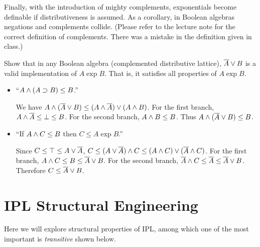 \documentclass[12pt]{article}
\newcommand{\cut}[1]{}
\newcommand{\showsol}[1]{\color{FireBrick}#1\normalcolor}%
\newcommand{\showsol}[1]{\cut{#1}}%
\newenvironment{sol}{\trivlist \item[\hskip \labelsep{\bf
Solution:}]}{\endtrivlist}
\begin{document}
Finally, with the introduction of mighty complements,
exponentials become definable if distributiveness is assumed.
As a corollary, in Boolean algebras negations and complements collide.
(Please refer to the lecture note for the correct definition of complements.
There was a mistake in the definition given in class.)
\begin{task}
  Show that in any Boolean algebra (complemented distributive lattice),
  $\overline{A} \vee B$ is a valid implementation of $A \exp B$.
  That is, it satisfies all properties of $A \exp B$.
\end{task}
\showsol{
\begin{sol}\mbox{}
  \begin{itemize}
    \item ``$A \wedge (A \supset B) \leq B$.''

      We have $A \wedge (\overline{A} \vee B) \leq (A \wedge \overline{A}) \vee (A \wedge B)$.
      For the first branch, $A \wedge \overline{A} \leq \bot \leq B$.
      For the second branch, $A \wedge B \leq B$.
      Thus $A \wedge (\overline{A} \vee B) \leq B$.
    \item ``If $A \wedge C \leq B$ then $C \leq A \exp B$.''

      Since $C \leq \top \leq A \vee \overline{A}$,
      $C \leq (A \vee \overline{A}) \wedge C \leq (A \wedge C) \vee (\overline{A} \wedge C)$.
      For the first branch, $A \wedge C \leq B \leq \overline{A} \vee B$.
      For the second branch, $\overline{A} \wedge C \leq \overline{A} \leq \overline{A} \vee B$.
      Therefore $C \leq \overline{A} \vee B$.
  \end{itemize}
\end{sol}
}

\section{IPL Structural Engineering}

Here we will explore structural properties of IPL, among which
one of the most important is \emph{transitive} shown below.
\end{document}
